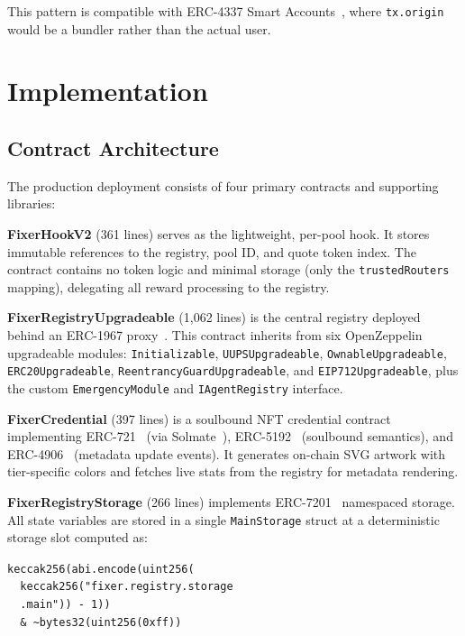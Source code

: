 \documentclass[conference]{IEEEtran}
\begin{document}
This pattern is compatible with ERC-4337 Smart Accounts~\cite{erc4337}, where \texttt{tx.origin} would be a bundler rather than the actual user.

\section{Implementation}
\label{sec:impl}

\subsection{Contract Architecture}

The production deployment consists of four primary contracts and supporting libraries:

\textbf{FixerHookV2} (361 lines) serves as the lightweight, per-pool hook. It stores immutable references to the registry, pool ID, and quote token index. The contract contains no token logic and minimal storage (only the \texttt{trustedRouters} mapping), delegating all reward processing to the registry.

\textbf{FixerRegistryUpgradeable} (1,062 lines) is the central registry deployed behind an ERC-1967 proxy~\cite{erc1967}. This contract inherits from six OpenZeppelin upgradeable modules: \texttt{Initializable}, \texttt{UUPS\-Upgradeable}, \texttt{Ownable\-Upgradeable}, \texttt{ERC20\-Upgradeable}, \texttt{Reentrancy\-Guard\-Upgradeable}, and \texttt{EIP712\-Upgradeable}, plus the custom \texttt{Emergency\-Module} and \texttt{IAgent\-Registry} interface.

\textbf{FixerCredential} (397 lines) is a soulbound NFT credential contract implementing ERC-721~\cite{erc721} (via Solmate~\cite{solmate}), ERC-5192~\cite{erc5192} (soulbound semantics), and ERC-4906~\cite{erc4906} (metadata update events). It generates on-chain SVG artwork with tier-specific colors and fetches live stats from the registry for metadata rendering.

\textbf{FixerRegistryStorage} (266 lines) implements ERC-7201~\cite{erc7201} namespaced storage. All state variables are stored in a single \texttt{MainStorage} struct at a deterministic storage slot computed as:

\begin{small}
\noindent\texttt{keccak256(abi.encode(uint256(}\\
\texttt{\ \ keccak256("fixer.registry.storage}\\
\texttt{\ \ .main")) - 1))}\\
\texttt{\ \ \& \textasciitilde bytes32(uint256(0xff))}
\end{small}
\end{document}
